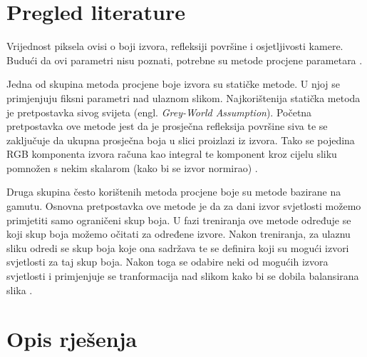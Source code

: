 \documentclass[conference]{IEEEtran}
\begin{document}
\section{Pregled literature}
Vrijednost piksela ovisi o boji izvora, refleksiji površine i osjetljivosti kamere.
Budući da ovi parametri nisu poznati, potrebne su metode procjene parametara \cite{article}.

Jedna od skupina metoda procjene boje izvora su statičke metode. U njoj se primjenjuju
fiksni parametri nad ulaznom slikom. Najkorištenija statička metoda je pretpostavka sivog
svijeta (engl. \textit{Grey-World Assumption}). Početna pretpostavka ove metode jest da je
prosječna refleksija površine siva te se zaključuje da ukupna prosječna boja u slici proizlazi
iz izvora. Tako se pojedina RGB komponenta izvora računa kao integral te komponent kroz
cijelu sliku pomnožen s nekim skalarom (kako bi se izvor normirao) \cite{BUCHSBAUM19801}.

Druga skupina često korištenih metoda procjene boje su metode bazirane na gamutu.
Osnovna pretpostavka ove metode je da za dani izvor svjetlosti možemo primjetiti
samo ograničeni skup boja. U fazi treniranja ove metode određuje se koji skup boja
možemo očitati za određene izvore. Nakon treniranja, za ulaznu sliku odredi se skup
boja koje ona sadržava te se definira koji su mogući izvori svjetlosti za taj skup boja.
Nakon toga se odabire neki od mogućih izvora svjetlosti i primjenjuje se tranformacija nad
slikom kako bi se dobila balansirana slika \cite{Forsyth1990}.


\section{Opis rješenja}
\end{document}
